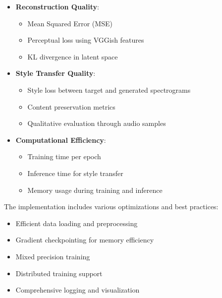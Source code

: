 \begin{itemize}
    \item \textbf{Reconstruction Quality}:
    \begin{itemize}
        \item Mean Squared Error (MSE)
        \item Perceptual loss using VGGish features
        \item KL divergence in latent space
    \end{itemize}
    
    \item \textbf{Style Transfer Quality}:
    \begin{itemize}
        \item Style loss between target and generated spectrograms
        \item Content preservation metrics
        \item Qualitative evaluation through audio samples
    \end{itemize}
    
    \item \textbf{Computational Efficiency}:
    \begin{itemize}
        \item Training time per epoch
        \item Inference time for style transfer
        \item Memory usage during training and inference
    \end{itemize}
\end{itemize}

The implementation includes various optimizations and best practices:
\begin{itemize}
    \item Efficient data loading and preprocessing
    \item Gradient checkpointing for memory efficiency
    \item Mixed precision training
    \item Distributed training support
    \item Comprehensive logging and visualization
\end{itemize} 